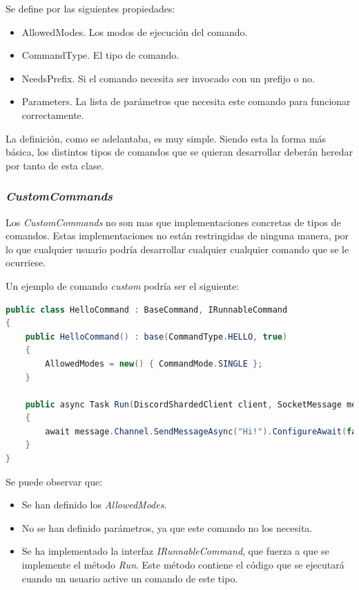 Se define por las siguientes propiedades:

\begin{itemize}
	\item AllowedModes. Los modos de ejecución del comando.
	\item CommandType. El tipo de comando.
	\item NeedsPrefix. Si el comando necesita ser invocado con un prefijo o no.
	\item Parameters. La lista de parámetros que necesita este comando para funcionar correctamente.
\end{itemize}

La definición, como se adelantaba, es muy simple. Siendo esta la forma más básica, los distintos tipos de comandos que se quieran desarrollar deberán heredar por tanto de esta clase.


\subsubsection{\textit{CustomCommands}}

Los \textit{CustomCommands} no son mas que implementaciones concretas de tipos de comandos. Estas implementaciones no están restringidas de ninguna manera, por lo que cualquier usuario podría desarrollar cualquier cualquier comando que se le ocurriese.

Un ejemplo de comando \textit{custom} podría ser el siguiente:

\begin{lstlisting}[language=java]
public class HelloCommand : BaseCommand, IRunnableCommand
{
    public HelloCommand() : base(CommandType.HELLO, true)
    {
        AllowedModes = new() { CommandMode.SINGLE };
    }

    public async Task Run(DiscordShardedClient client, SocketMessage message, Bot botSettings, UserCommand command)
    {
        await message.Channel.SendMessageAsync("Hi!").ConfigureAwait(false);
    }
}
\end{lstlisting}

Se puede observar que:

\begin{itemize}
	\item Se han definido los \textit{AllowedModes}.
	\item No se han definido parámetros, ya que este comando no los necesita.
	\item Se ha implementado la interfaz \textit{IRunnableCommand}, que fuerza a que se implemente el método \textit{Run}. Este método contiene el código que se ejecutará cuando un usuario active un comando de este tipo.
\end{itemize}

